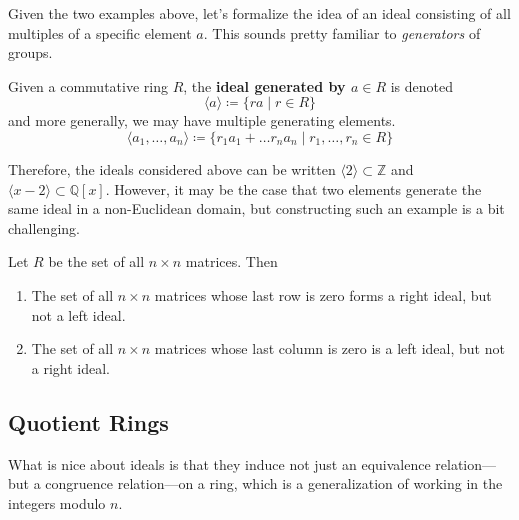   Given the two examples above, let's formalize the idea of an ideal consisting of all multiples of a specific element $a$. This sounds pretty familiar to \textit{generators} of groups. 

  \begin{definition}
    Given a commutative ring $R$, the \textbf{ideal generated by $a \in R$} is denoted 
    \begin{equation}
      \langle a \rangle \coloneqq \{r a \mid r \in R\}
    \end{equation}
    and more generally, we may have multiple generating elements. 
    \begin{equation}
      \langle a_1, \ldots, a_n \rangle \coloneqq \{ r_1 a_1 + \ldots r_n a_n \mid r_1, \ldots, r_n \in R \}
    \end{equation}
  \end{definition}

  Therefore, the ideals considered above can be written $\langle 2 \rangle \subset \mathbb{Z}$ and $\langle x - 2 \rangle \subset \mathbb{Q}[x]$. However, it may be the case that two elements generate the same ideal in a non-Euclidean domain, but constructing such an example is a bit challenging.   

  \begin{example}
    Let $R$ be the set of all $n \times n$ matrices. Then 
    \begin{enumerate}
      \item The set of all $n \times n$ matrices whose last row is zero forms a right ideal, but not a left ideal.
      \item The set of all $n\times n$ matrices whose last column is zero is a left ideal, but not a right ideal. 
    \end{enumerate}
  \end{example}

\subsection{Quotient Rings}

  What is nice about ideals is that they induce not just an equivalence relation---but a congruence relation---on a ring, which is a generalization of working in the integers modulo $n$. 

